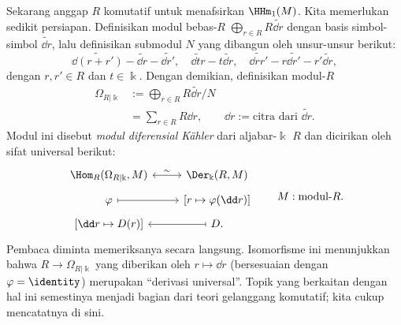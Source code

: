 \begin{contoh}
	Sekarang anggap $R$ komutatif untuk menafsirkan $\HHm_1(M)$. Kita
	memerlukan sedikit persiapan. Definisikan modul bebas-$R$
	$\bigoplus_{r\in R}R\widetilde{\dd r}$ dengan basis simbol-simbol
	$\widetilde{\dd r}$, lalu definisikan submodul $N$ yang dibangun oleh
	unsur-unsur berikut:
	\[ \widetilde{\dd(r+r')}-\widetilde{\dd r}-\widetilde{\dd r'},
		\quad \widetilde{\dd tr}-t\widetilde{\dd r},
		\quad \widetilde{\dd rr'}-r\widetilde{\dd r'}-r'\widetilde{\dd r}, \]
	dengan $r,r'\in R$ dan $t\in\Bbbk$. Dengan demikian, definisikan
	modul-$R$
	\begin{align*}
		\Omega_{R|\Bbbk}
		&:=\bigoplus_{r\in R}R\widetilde{\dd r}\bigg/N\\
		&=\sum_{r\in R}R\dd r,\qquad
		\dd r:=\text{citra dari }\widetilde{\dd r}.
	\end{align*}
	Modul ini disebut \emph{modul diferensial Kähler} dari aljabar-$\Bbbk$
	$R$ dan dicirikan oleh sifat universal berikut:
	\[\begin{tikzcd}[row sep=tiny]
		\Hom_R(\Omega_{R|\Bbbk}, M) \arrow[leftrightarrow, r, "\sim"]
		& \Der_{\Bbbk}(R, M) \\
		\varphi \arrow[mapsto, r] & {\left[r\mapsto\varphi(\dd r)\right]} \\
		{\left[\dd r\mapsto D(r)\right]} & D \arrow[mapsto, l].
	\end{tikzcd}
	\qquad M:\text{modul-$R$}. \]
	Pembaca diminta memeriksanya secara langsung. Isomorfisme ini menunjukkan
	bahwa $R\to\Omega_{R|\Bbbk}$ yang diberikan oleh $r\mapsto\dd r$
	(bersesuaian dengan $\varphi=\identity$) merupakan ``derivasi universal''.
	Topik yang berkaitan dengan hal ini semestinya menjadi bagian dari teori
	gelanggang komutatif; kita cukup mencatatnya di sini.


\end{contoh}
